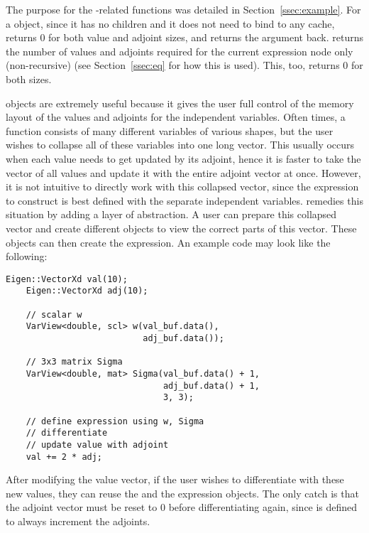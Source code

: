 The purpose for the -related functions was detailed in Section~\ref{ssec:example}.
For a  object, 
since it has no children and it does not need to bind to any cache,
 returns $ 0$ for both value and adjoint sizes,
and  returns the argument back.
 returns the number of values and adjoints required
for the current expression node only (non-recursive) 
(see Section~\ref{ssec:eq} for how this is used).
This, too, returns $ 0$ for both sizes.

 objects are extremely useful because it gives the user full control 
of the memory layout of the values and adjoints for the independent variables.
Often times, a function consists of many different variables of various shapes,
but the user wishes to collapse all of these variables into one long vector.
This usually occurs when each value needs to get updated by its adjoint,
hence it is faster to take the vector of all values and update it with the entire adjoint vector at once.
However, it is not intuitive to directly work with this collapsed vector,
since the expression to construct is best defined with the separate independent variables.
 remedies this situation by adding a layer of abstraction.
A user can prepare this collapsed vector and create different 
objects to view the correct parts of this vector.
These  objects can then create the expression.
An example code may look like the following:
\begin{lstlisting}[style=customcpp]
    Eigen::VectorXd val(10);
    Eigen::VectorXd adj(10);

    // scalar w
    VarView<double, scl> w(val_buf.data(), 
                           adj_buf.data());

    // 3x3 matrix Sigma
    VarView<double, mat> Sigma(val_buf.data() + 1,
                               adj_buf.data() + 1,
                               3, 3);

    // define expression using w, Sigma
    // differentiate
    // update value with adjoint
    val += 2 * adj;
\end{lstlisting}

After modifying the value vector, if the user wishes to differentiate with these new values,
they can reuse the  and the expression objects.
The only catch is that the adjoint vector must be reset to 0 before differentiating again,
since  is defined to always increment the adjoints.
